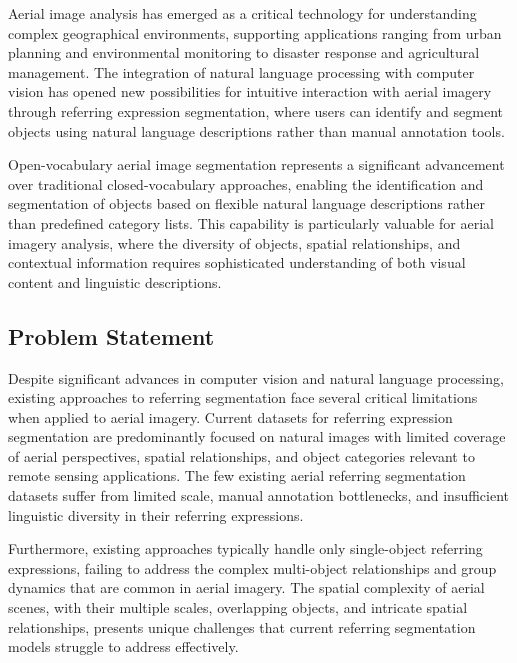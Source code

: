 \cleardoublepage
\label{chap:intro}
Aerial image analysis has emerged as a critical technology for understanding complex geographical environments, supporting applications ranging from urban planning and environmental monitoring to disaster response and agricultural management. The integration of natural language processing with computer vision has opened new possibilities for intuitive interaction with aerial imagery through referring expression segmentation, where users can identify and segment objects using natural language descriptions rather than manual annotation tools.

Open-vocabulary aerial image segmentation represents a significant advancement over traditional closed-vocabulary approaches, enabling the identification and segmentation of objects based on flexible natural language descriptions rather than predefined category lists. This capability is particularly valuable for aerial imagery analysis, where the diversity of objects, spatial relationships, and contextual information requires sophisticated understanding of both visual content and linguistic descriptions.

\subsection{Problem Statement}

Despite significant advances in computer vision and natural language processing, existing approaches to referring segmentation face several critical limitations when applied to aerial imagery. Current datasets for referring expression segmentation are predominantly focused on natural images with limited coverage of aerial perspectives, spatial relationships, and object categories relevant to remote sensing applications. The few existing aerial referring segmentation datasets suffer from limited scale, manual annotation bottlenecks, and insufficient linguistic diversity in their referring expressions.

Furthermore, existing approaches typically handle only single-object referring expressions, failing to address the complex multi-object relationships and group dynamics that are common in aerial imagery. The spatial complexity of aerial scenes, with their multiple scales, overlapping objects, and intricate spatial relationships, presents unique challenges that current referring segmentation models struggle to address effectively.

